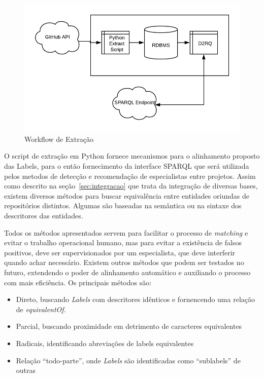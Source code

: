 \documentclass[sigconf]{acmart}
\begin{document}
\begin{figure}[!htbp]
 \centering
 \includegraphics[width=\columnwidth]{workflow_ontologia}
 \caption{Workflow de Extração}\label{fig:workflow_ontologia}
\end{figure}


O script de extração em Python fornece mecanismos para o alinhamento proposto das Labels, para o então fornecimento da interface SPARQL que será utilizada pelos metodos de detecção e recomendação de especialistas entre projetos. Assim como descrito na seção~\ref{sec:integracao} que trata da integração de diversas bases, existem diversos métodos para buscar equivalência entre entidades oriundas de repositórios distintos. Algumas são baseadas na semântica ou na sintaxe dos descritores das entidades.

Todos os métodos apresentados servem para facilitar o processo de \textit{matching} e evitar o trabalho operacional humano, mas para evitar a existência de falsos positivos, deve ser supervisionados por um especialista, que deve interferir quando achar necessário. Existem outros métodos que podem ser testados no futuro, extendendo o poder de alinhamento automático e auxiliando o processo com mais eficiência. Os principais métodos são:

\begin{itemize}
  \item Direto, buscando \textit{Labels} com descritores idênticos e fornencendo uma relação de \textit{equivalentOf}.
  \item Parcial, buscando proximidade em detrimento de caracteres equivalentes
  \item Radicais, identificando abreviações de labels equivalentes
  \item Relação ``todo-parte'', onde \textit{Labels} são identificadas como ``sublabels'' de outras
\end{itemize}
\end{document}

